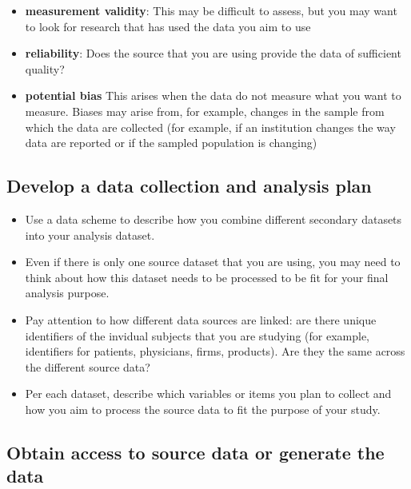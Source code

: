 \documentclass[
]{book}
\providecommand{\tightlist}{%
  \setlength{\itemsep}{0pt}\setlength{\parskip}{0pt}}
\begin{document}
\begin{itemize}
\tightlist
\item
  \textbf{measurement validity}: This may be difficult to assess, but
  you may want to look for research that has used the data you aim to
  use
\item
  \textbf{reliability}: Does the source that you are using provide the
  data of sufficient quality?
\item
  \textbf{potential bias} This arises when the data do not measure what
  you want to measure. Biases may arise from, for example, changes in
  the sample from which the data are collected (for example, if an
  institution changes the way data are reported or if the sampled
  population is changing)
\end{itemize}

\hypertarget{develop-a-data-collection-and-analysis-plan}{%
\subsection{Develop a data collection and analysis
plan}\label{develop-a-data-collection-and-analysis-plan}}

\begin{itemize}
\tightlist
\item
  Use a data scheme to describe how you combine different secondary
  datasets into your analysis dataset.
\item
  Even if there is only one source dataset that you are using, you may
  need to think about how this dataset needs to be processed to be fit
  for your final analysis purpose.
\item
  Pay attention to how different data sources are linked: are there
  unique identifiers of the invidual subjects that you are studying (for
  example, identifiers for patients, physicians, firms, products). Are
  they the same across the different source data?
\item
  Per each dataset, describe which variables or items you plan to
  collect and how you aim to process the source data to fit the purpose
  of your study.
\end{itemize}

\hypertarget{obtain-access-to-source-data-or-generate-the-data}{%
\subsection{Obtain access to source data or generate the
data}\label{obtain-access-to-source-data-or-generate-the-data}}
\end{document}
